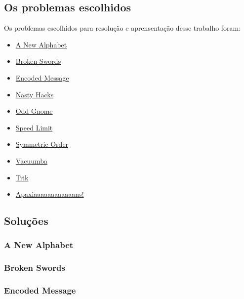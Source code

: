 \documentclass[hidelinks]{article}
\begin{document}
        \subsection{Os problemas escolhidos}
            Os problemas escolhidos para resolução e aprensentação desse trabalho foram:
            \begin{itemize}
                \item \href{https://open.kattis.com/problems/anewalphabet}{A New Alphabet}
                \item \href{https://open.kattis.com/problems/brokenswords}{Broken Swords}
                \item \href{https://open.kattis.com/problems/encodedmessage}{Encoded Message}
                \item \href{https://open.kattis.com/problems/nastyhacks}{Nasty Hacks}
                \item \href{https://open.kattis.com/problems/oddgnome}{Odd Gnome}
                \item \href{https://open.kattis.com/problems/speedlimit}{Speed Limit}
                \item \href{https://open.kattis.com/problems/symmetricorder}{Symmetric Order}
                \item \href{https://open.kattis.com/problems/vacuumba}{Vacuumba}
                \item \href{https://open.kattis.com/problems/trik}{Trik}
                \item \href{https://open.kattis.com/problems/apaxiaaans}{Apaxiaaaaaaaaaaaans!}        
            \end{itemize}
        \subsection{Soluções}
            \subsubsection{A New Alphabet}
                
            \subsubsection{Broken Swords}
                
            \subsubsection{Encoded Message}
                
\end{document}
